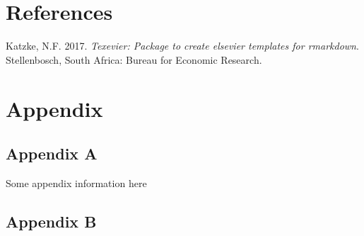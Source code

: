 \documentclass[11pt,preprint, authoryear]{elsarticle}
\numberwithin{equation}{section}
\numberwithin{figure}{section}
\numberwithin{table}{section}
\newlength{\cslhangindent}
\newenvironment{CSLReferences}%
  {\setlength{\parindent}{0pt}%
  \everypar{\setlength{\hangindent}{\cslhangindent}}\ignorespaces}%
  {\par}
\begin{document}
\newpage

\hypertarget{references}{%
\section*{References}\label{references}}

\hypertarget{refs}{}
\begin{CSLReferences}{1}{0}
\leavevmode{}%
Katzke, N.F. 2017. \emph{{Texevier}: {P}ackage to create elsevier
templates for rmarkdown}. Stellenbosch, South Africa: Bureau for
Economic Research.

\end{CSLReferences}

\hypertarget{appendix}{%
\section*{Appendix}\label{appendix}}

\hypertarget{appendix-a}{%
\subsection*{Appendix A}\label{appendix-a}}

Some appendix information here

\hypertarget{appendix-b}{%
\subsection*{Appendix B}\label{appendix-b}}


\end{document}
